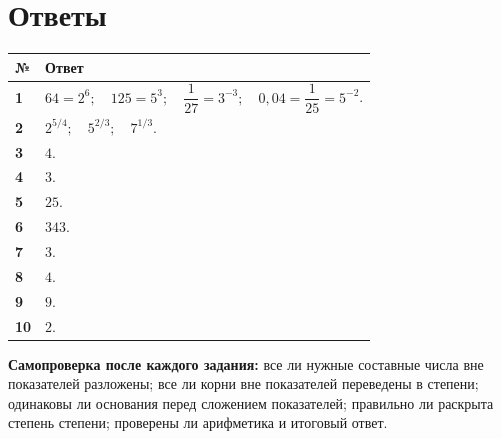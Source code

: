 \documentclass[a4paper,12pt]{article}
\begin{document}
\clearpage

\section*{Ответы}

\begin{tabularx}{\linewidth}{@{}>{\bfseries}p{12mm}X@{}}
\toprule
№ & Ответ \\
\midrule
1 & \(64=2^6;\quad 125=5^3;\quad \dfrac1{27}=3^{-3};\quad 0{,}04=\dfrac1{25}=5^{-2}\). \\
2 & \(2^{5/4};\quad 5^{2/3};\quad 7^{1/3}\). \\
3 & \(4\). \\
4 & \(3\). \\
5 & \(25\). \\
6 & \(343\). \\
7 & \(3\). \\
8 & \(4\). \\
9 & \(9\). \\
10 & \(2\). \\
\bottomrule
\end{tabularx}

\vfill
{\small\color{softgray}\textbf{Самопроверка после каждого задания:} все ли нужные составные числа вне показателей разложены; все ли корни вне показателей переведены в степени; одинаковы ли основания перед сложением показателей; правильно ли раскрыта степень степени; проверены ли арифметика и итоговый ответ.}
\end{document}
